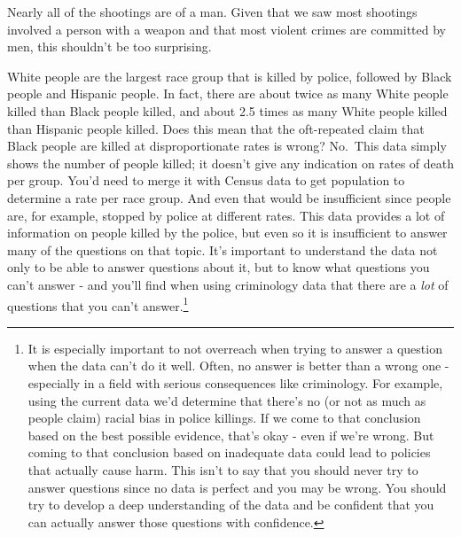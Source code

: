 \documentclass[
]{krantz}
\makeatletter
\newenvironment{Shaded}{\begin{snugshade}}{\end{snugshade}}
\newcommand{\AttributeTok}[1]{\textcolor[rgb]{0.61,0.61,0.61}{#1}}
\newcommand{\CommentTok}[1]{\textcolor[rgb]{0.37,0.37,0.37}{\textit{#1}}}
\newcommand{\DecValTok}[1]{\textcolor[rgb]{0.06,0.06,0.06}{#1}}
\newcommand{\FunctionTok}[1]{\textcolor[rgb]{0,0,0}{#1}}
\newcommand{\NormalTok}[1]{#1}
\newcommand{\OtherTok}[1]{\textcolor[rgb]{0.37,0.37,0.37}{#1}}
\newcommand{\SpecialCharTok}[1]{\textcolor[rgb]{0,0,0}{#1}}
\newenvironment{kframe}{%
\medskip{}
\setlength{\fboxsep}{.8em}
 \def\at@end@of@kframe{}%
 \ifinner\ifhmode%
  \def\at@end@of@kframe{\end{minipage}}%
  \begin{minipage}{\columnwidth}%
 \fi\fi%
 \def\FrameCommand##1{\hskip\@totalleftmargin \hskip-\fboxsep
 \colorbox{shadecolor}{##1}\hskip-\fboxsep
     \hskip-\linewidth \hskip-\@totalleftmargin \hskip\columnwidth}%
 \MakeFramed {\advance\hsize-\width
   \@totalleftmargin\z@ \linewidth\hsize
   \@setminipage}}%
 {\par\unskip\endMakeFramed%
 \at@end@of@kframe}
\renewenvironment{Shaded}{\begin{kframe}}{\end{kframe}}
\makeatother
\begin{document}
Nearly all of the shootings are of a man. Given that we saw most shootings involved a person with a weapon and that most violent crimes are committed by men, this shouldn't be too surprising.

\begin{Shaded}
\end{Shaded}

White people are the largest race group that is killed by police, followed by Black people and Hispanic people. In fact, there are about twice as many White people killed than Black people killed, and about 2.5 times as many White people killed than Hispanic people killed. Does this mean that the oft-repeated claim that Black people are killed at disproportionate rates is wrong? No.~This data simply shows the number of people killed; it doesn't give any indication on rates of death per group. You'd need to merge it with Census data to get population to determine a rate per race group. And even that would be insufficient since people are, for example, stopped by police at different rates. This data provides a lot of information on people killed by the police, but even so it is insufficient to answer many of the questions on that topic. It's important to understand the data not only to be able to answer questions about it, but to know what questions you can't answer - and you'll find when using criminology data that there are a \emph{lot} of questions that you can't answer.\footnote{It is especially important to not overreach when trying to answer a question when the data can't do it well. Often, no answer is better than a wrong one - especially in a field with serious consequences like criminology. For example, using the current data we'd determine that there's no (or not as much as people claim) racial bias in police killings. If we come to that conclusion based on the best possible evidence, that's okay - even if we're wrong. But coming to that conclusion based on inadequate data could lead to policies that actually cause harm. This isn't to say that you should never try to answer questions since no data is perfect and you may be wrong. You should try to develop a deep understanding of the data and be confident that you can actually answer those questions with confidence.}
\end{document}
